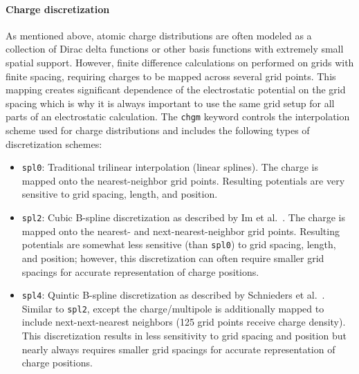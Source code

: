 \documentclass[12pt,titlepage]{article}
\newcommand{\keyword}[1]{\texttt{#1}}
\begin{document}
\paragraph{Charge discretization}
As mentioned above, atomic charge distributions are often modeled as a collection of Dirac delta functions or other basis functions with extremely small spatial support.
However, finite difference calculations on performed on grids with finite spacing, requiring charges to be mapped across several grid points.
This mapping creates significant dependence of the electrostatic potential on the grid spacing which is why it is always important to use the same grid setup for all parts of an electrostatic calculation.
The \keyword{chgm} keyword controls the interpolation scheme used for charge distributions and includes the following types of discretization schemes:
\begin{itemize}
	\item \keyword{spl0}: Traditional trilinear interpolation (linear splines).
	The charge is mapped onto the nearest-neighbor grid points.
	Resulting potentials are very sensitive to grid spacing, length, and position.
	\item \keyword{spl2}: Cubic B-spline discretization as described by Im et al.~\cite{IBR98}.
	The charge is mapped onto the nearest- and next-nearest-neighbor grid points.
	Resulting potentials are somewhat less sensitive (than \keyword{spl0}) to grid spacing, length, and position; however, this discretization can often require smaller grid spacings for accurate representation of charge positions.
	\item \keyword{spl4}: Quintic B-spline discretization as described by Schnieders et al.~\cite{Schnieders2007}.
	Similar to \keyword{spl2}, except the charge/multipole is additionally mapped to include next-next-nearest neighbors (125 grid points receive charge density).
	This discretization results in less sensitivity to grid spacing and position but nearly always requires smaller grid spacings for accurate representation of charge positions.
\end{itemize}
\end{document}
